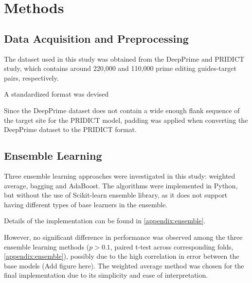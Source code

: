 \section{Methods}

\subsection*{Data Acquisition and Preprocessing}

The dataset used in this study was obtained from the DeepPrime and PRIDICT study\cite{mathisPredictingPrimeEditing2023,mathisMachineLearningPrediction2024,yuPredictionEfficienciesDiverse2023}, which contains around 220,000 and 110,000 prime editing guides-target pairs, respectively. 

A standardized format was devised 

Since the DeepPrime dataset does not contain a wide enough flank sequence of the target site for the PRIDICT model, padding was applied when converting the DeepPrime dataset to the PRIDICT format. 

\subsection*{Ensemble Learning}

Three ensemble learning approaches were investigated in this study: weighted average, bagging and AdaBoost. The algorithms were implemented in Python, but without the use of Scikit-learn ensemble library, as it does not support having different types of base learners in the ensemble.  

Details of the implementation can be found in \autoref{appendix:ensemble}.

However, no significant difference in performance was observed among the three ensemble learning methods ($p>0.1$, paired t-test across corresponding folds, \autoref{appendix:ensemble}), possibly due to the high correlation in error between the base models (Add figure here). The weighted average method was chosen for the final implementation due to its simplicity and ease of interpretation.